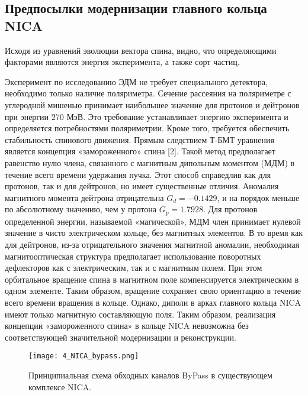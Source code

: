 	\subsection{Предпосылки модернизации главного кольца NICA}\label{sec:EDM/Wien_filter/modernization}

\par Исходя из уравнений эволюции вектора спина, видно, что определяющими факторами являются энергия эксперимента, а также сорт частиц.

\par Эксперимент по исследованию ЭДМ не требует специального детектора, необходимо только наличие поляриметра. Сечение рассеяния на поляриметре с углеродной мишенью принимает наибольшее значение для протонов и дейтронов при энергии $270$ МэВ. Это требование устанавливает энергию эксперимента и определяется потребностями поляриметрии.
Кроме того, требуется обеспечить стабильность спинового движения. Прямым следствием Т-БМТ уравнения является концепция «замороженного» спина [2]. Такой метод предполагает равенство нулю члена, связанного с магнитным дипольным моментом (МДМ) в течение всего времени удержания пучка. Этот способ справедлив как для протонов, так и для дейтронов, но имеет существенные отличия. Аномалия магнитного момента дейтрона отрицательна $G_{d}=-0.1429$, и на порядок меньше по абсолютному значению, чем у протона $G_{p}=1.7928$. Для протонов определенной энергии, называемой «магической», МДМ член принимает нулевой значение в чисто электрическом кольце, без магнитных элементов. В то время как для дейтронов, из-за отрицательного значения магнитной аномалии, необходимая магнитооптическая структура предполагает использование поворотных дефлекторов как с электрическим, так и с магнитным полем. При этом орбитальное вращение спина в магнитном поле компенсируется электрическим в одном элементе. Таким образом, вращение сохраняет свою ориентацию в течение всего времени вращения в кольце. Однако, диполи в арках главного кольца NICA имеют только магнитную составляющую поля. Таким образом, реализация концепции «замороженного спина» в кольце NICA невозможна без соответствующей значительной модернизации и реконструкции.

\begin{figure}[!h]
  \centering
   \texttt{[image: 4\_NICA\_bypass.png]}
   \caption{Принципиальная схема обходных каналов ByPass в существующем комплексе NICA.}
   \label{fig:4_NICA_bypass}
\end{figure}

